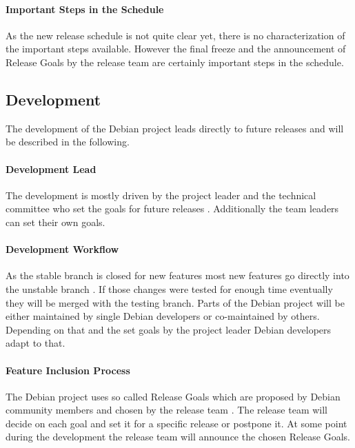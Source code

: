 \paragraph{Important Steps in the Schedule}

As the new release schedule is not quite clear yet, there is no
characterization of the important steps available. However the final freeze and
the announcement of Release Goals by the release team are certainly important
steps in the schedule.

\subsection{Development}

The development of the Debian project leads directly to future releases and
will be described in the following.

\paragraph{Development Lead}

The development is mostly driven by the project leader and the technical
committee who set the goals for future releases \cite{DebianOrg}. Additionally
the team leaders can set their own goals.

\paragraph{Development Workflow}

As the stable branch is closed for new features most new features go directly
into the unstable branch \cite{DebianFAQ,DebianDev,DebianReleaseManagement}. If
those changes were tested for enough time eventually they will be merged with
the testing branch. Parts of the Debian project will be either maintained by
single Debian developers or co-maintained by others. Depending on that and the
set goals by the project leader Debian developers adapt to that.

\paragraph{Feature Inclusion Process}

The Debian project uses so called Release Goals which are proposed by Debian
community members and chosen by the release team
\cite{DebianReleaseGoals,McGovern2011}. The release team will decide on each
goal and set it for a specific release or postpone it. At some point during the
development the release team will announce the chosen Release Goals.


